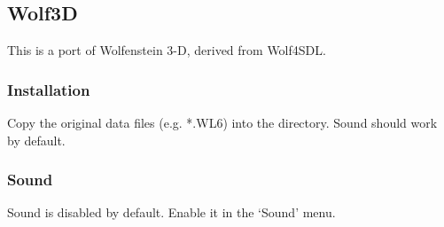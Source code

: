 \subsection{Wolf3D}

This is a port of Wolfenstein 3-D, derived from Wolf4SDL.

\subsubsection{Installation}
Copy the original data files (e.g. *.WL6) into the
 directory. Sound should work by default.

\subsubsection{Sound}
Sound is disabled by default. Enable it in the `Sound' menu.
